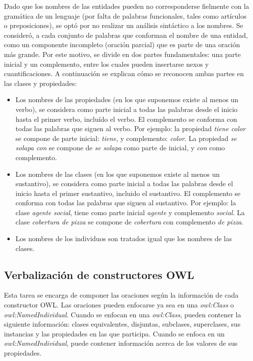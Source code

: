 Dado que los nombres de las entidades pueden no corresponderse fielmente con la gramática de un lenguaje (por falta de palabras funcionales, tales como artículos o preposiciones), se optó por no realizar un análisis sintáctico a los nombres. Se consideró, a cada conjunto de palabras que conforman el nombre de una entidad, como un componente incompleto (oración parcial) que es parte de una oración más grande. Por este motivo, se divide en dos partes fundamentales: una parte inicial y un complemento, entre los cuales pueden insertarse nexos y cuantificaciones. A continuación se explican cómo se reconocen ambas partes en las clases y propiedades:
\begin{itemize}
    \item Los nombres de las propiedades (en los que suponemos existe al menos un verbo), se considera como parte inicial a todas las palabras desde el inicio hasta el primer verbo, incluído el verbo. El complemento se conforma con todas las palabras que siguen al verbo. Por ejemplo: la propiedad \emph{tiene color} se compone de parte inicial: \emph{tiene}, y complemento: \emph{color}. La propiedad \emph{se solapa con} se compone de \emph{se solapa} como parte de inicial, y \emph{con} como complemento.
    \item Los nombres de las clases (en los que suponemos existe al menos un sustantivo), se considera como parte inicial a todas las palabras desde el inicio hasta el primer sustantivo, incluido el sustantivo. El complemento se conforma con todas las palabras que siguen al sustantivo. Por ejemplo: la clase \emph{agente social}, tiene como parte inicial \emph{agente} y complemento \emph{social}. La clase \emph{cobertura de pizza} se compone de \emph{cobertura} con complemento \emph{de pizza}.
    \item Los nombres de los individuos son tratados igual que los nombres de las clases.
\end{itemize}


\subsection{Verbalización de constructores OWL}
Esta tarea se encarga de componer las oraciones según la información de cada constructor OWL. Las oraciones pueden enfocarse ya sea en una \emph{owl:Class} o  \emph{owl:NamedIndividual}. Cuando se enfocan en una \emph{owl:Class}, pueden contener la siguiente información: clases equivalentes, disjuntas, subclases, superclases, sus instancias y las propiedades en las que participa. Cuando se enfoca en un \emph{owl:NamedIndividual}, puede contener información acerca de los valores de sus propiedades.

